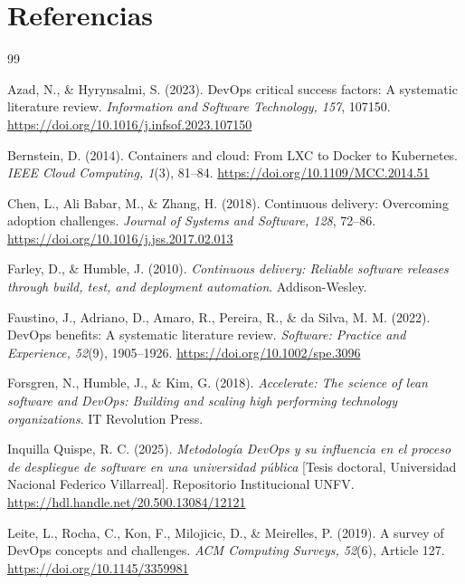 \documentclass[12pt,a4paper]{article}
\begin{document}
\section*{Referencias}
\begin{thebibliography}{99}

Azad, N., \& Hyrynsalmi, S. (2023). DevOps critical success factors: A systematic literature review. \textit{Information and Software Technology, 157}, 107150. \url{https://doi.org/10.1016/j.infsof.2023.107150}

Bernstein, D. (2014). Containers and cloud: From LXC to Docker to Kubernetes. \textit{IEEE Cloud Computing, 1}(3), 81--84. \url{https://doi.org/10.1109/MCC.2014.51}

Chen, L., Ali Babar, M., \& Zhang, H. (2018). Continuous delivery: Overcoming adoption challenges. \textit{Journal of Systems and Software, 128}, 72--86. \url{https://doi.org/10.1016/j.jss.2017.02.013}

Farley, D., \& Humble, J. (2010). \textit{Continuous delivery: Reliable software releases through build, test, and deployment automation}. Addison-Wesley.

Faustino, J., Adriano, D., Amaro, R., Pereira, R., \& da Silva, M. M. (2022). DevOps benefits: A systematic literature review. \textit{Software: Practice and Experience, 52}(9), 1905--1926. \url{https://doi.org/10.1002/spe.3096}

Forsgren, N., Humble, J., \& Kim, G. (2018). \textit{Accelerate: The science of lean software and DevOps: Building and scaling high performing technology organizations}. IT Revolution Press.

Inquilla Quispe, R. C. (2025). \textit{Metodología DevOps y su influencia en el proceso de despliegue de software en una universidad pública} [Tesis doctoral, Universidad Nacional Federico Villarreal]. Repositorio Institucional UNFV. \url{https://hdl.handle.net/20.500.13084/12121}

Leite, L., Rocha, C., Kon, F., Milojicic, D., \& Meirelles, P. (2019). A survey of DevOps concepts and challenges. \textit{ACM Computing Surveys, 52}(6), Article 127. \url{https://doi.org/10.1145/3359981}


\end{thebibliography}
\end{document}
